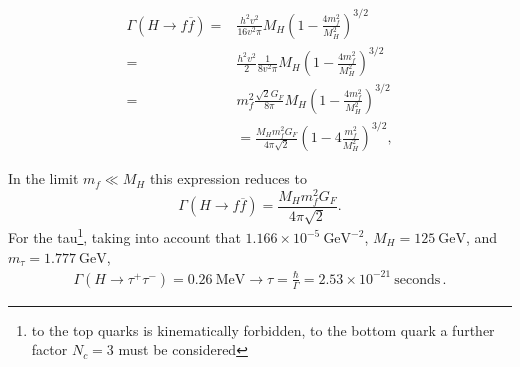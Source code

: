 \begin{align}
\Gamma(H\to f\overline{f})=&\frac{h^2v^2}{16 v^2 \pi}M_H\left(1-\frac{4m_f^2}{M_H^2}\right)^{3/2} \nonumber\\
=&\frac{h^2v^2}{2}\frac{1}{8 v^2 \pi}M_H\left(1-\frac{4m_f^2}{M_H^2}\right)^{3/2} \nonumber\\
=&m_f^2\frac{\sqrt{2}G_F}{8\pi}M_H\left(1-\frac{4m_f^2}{M_H^2}\right)^{3/2} \nonumber\\
&=\frac{M_{H}m_{f}^{2}G_{F}}{4\pi\sqrt{2}}
\left(1-4\frac{m^2_{f}}{M^2_{H}}\right)^{3/2}, 
\end{align}

In the limit $m_{f}\ll M_{H}$ this expression reduces to 
\begin{equation}
\Gamma(H\to
f\overline{f})=\frac{M_{H}m_{f}^{2}G_{F}}{4\pi\sqrt{2}}. 
\end{equation}
For the tau\footnote{to the top quarks is kinematically forbidden, to the bottom quark a further factor $N_c=3$ must be considered}, taking into account that $1.166 \times 10^{-5}\ \text{GeV}^{-2}$, $M_H=125\ \text{GeV}$, and $m_\tau=1.777\ \text{GeV}$,
\begin{align}
  \Gamma(H\to \tau^+\tau^-)=0.26\ \text{MeV}\to \tau= \frac{\hbar}{\Gamma}=2.53\times 10^{-21}\ \text{seconds}\,.
\end{align}





